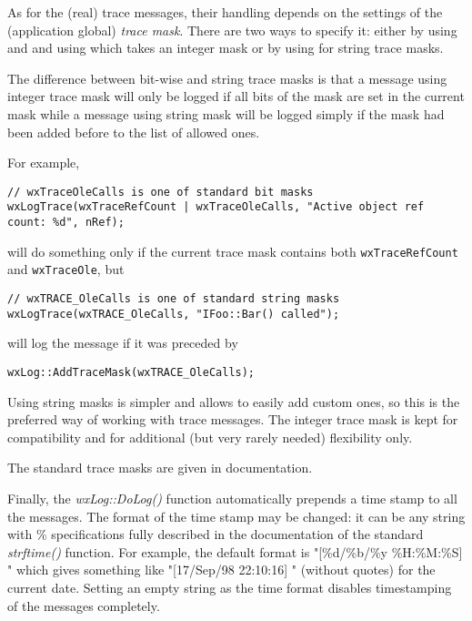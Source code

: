 As for the (real) trace messages, their handling depends on the settings of
the (application global) {\it trace mask}. There are two ways to specify it:
either by using  and
 and using
 which takes an integer mask or by using
 for string trace masks.

The difference between bit-wise and string trace masks is that a message using
integer trace mask will only be logged if all bits of the mask are set in the
current mask while a message using string mask will be logged simply if the
mask had been added before to the list of allowed ones.

For example,

\begin{verbatim}
// wxTraceOleCalls is one of standard bit masks
wxLogTrace(wxTraceRefCount | wxTraceOleCalls, "Active object ref count: %d", nRef);
\end{verbatim}
will do something only if the current trace mask contains both
{\tt wxTraceRefCount} and {\tt wxTraceOle}, but

\begin{verbatim}
// wxTRACE_OleCalls is one of standard string masks
wxLogTrace(wxTRACE_OleCalls, "IFoo::Bar() called");
\end{verbatim}

will log the message if it was preceded by

\begin{verbatim}
wxLog::AddTraceMask(wxTRACE_OleCalls);
\end{verbatim}

Using string masks is simpler and allows to easily add custom ones, so this is
the preferred way of working with trace messages. The integer trace mask is
kept for compatibility and for additional (but very rarely needed) flexibility
only.

The standard trace masks are given in 
documentation.

Finally, the {\it wxLog::DoLog()} function automatically prepends a time stamp
to all the messages. The format of the time stamp may be changed: it can be
any string with \% specifications fully described in the documentation of the
standard {\it strftime()} function. For example, the default format is
"[\%d/\%b/\%y \%H:\%M:\%S] " which gives something like "[17/Sep/98 22:10:16] "
(without quotes) for the current date. Setting an empty string as the time
format disables timestamping of the messages completely.

